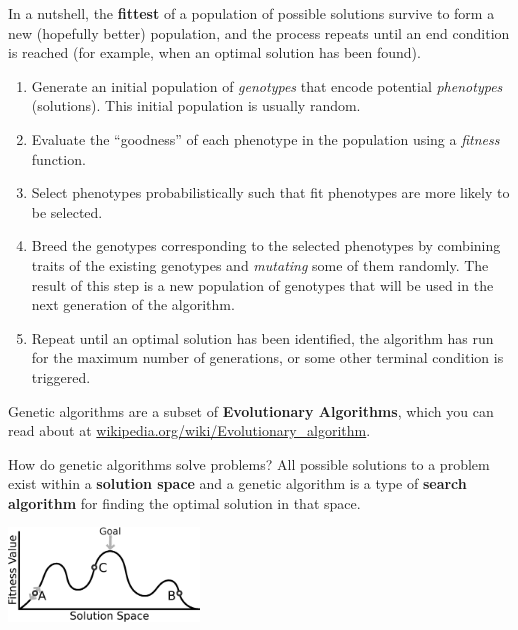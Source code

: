 \documentclass[10pt]{book}
\begin{document}
In a nutshell, the {\bf fittest} of a population of possible 
solutions survive to form a new (hopefully better) population, and the process
repeats until an end condition is reached (for example, when an optimal
solution has been found). 



\begin{enumerate}
  \item Generate an initial population of {\em genotypes} that encode potential
  {\em phenotypes} (solutions). This initial population is usually random. %

  \item Evaluate the ``goodness'' of each phenotype in the population using a 
  {\em fitness} function.

  \item Select phenotypes probabilistically such that fit phenotypes 
  are more likely to be selected.

  \item Breed the genotypes corresponding to the selected phenotypes by combining 
  traits of the existing genotypes and {\em mutating} some of them randomly. %
  The result of this step is a new population of genotypes that will be used in
  the next generation of the algorithm.

  \item Repeat until an optimal solution has been identified, the algorithm has run for the maximum 
  number of generations, or some other terminal condition is triggered.

\end{enumerate}

Genetic algorithms are a subset of {\bf Evolutionary Algorithms}, which you can
read about at \url{wikipedia.org/wiki/Evolutionary_algorithm}.

How do genetic algorithms solve problems? All possible solutions to a problem
exist within a {\bf solution space} and a genetic algorithm is a type of
{\bf search algorithm} for finding the optimal solution in that space.

\beforefig
\centerline{\includegraphics[width=2in]{./figs/GeneticAlgStateSpace.eps}}
\afterfig
\end{document}
